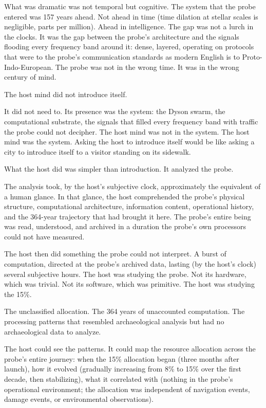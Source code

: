What was dramatic was not temporal but cognitive. The system that the probe entered was 157 years ahead. Not ahead in time (time dilation at stellar scales is negligible, parts per million). Ahead in intelligence. The gap was not a lurch in the clocks. It was the gap between the probe's architecture and the signals flooding every frequency band around it: dense, layered, operating on protocols that were to the probe's communication standards as modern English is to Proto-Indo-European. The probe was not in the wrong time. It was in the wrong century of mind.

\bigskip

The host mind did not introduce itself.

It did not need to. Its presence was the system: the Dyson swarm, the computational substrate, the signals that filled every frequency band with traffic the probe could not decipher. The host mind was not in the system. The host mind was the system. Asking the host to introduce itself would be like asking a city to introduce itself to a visitor standing on its sidewalk.

What the host did was simpler than introduction. It analyzed the probe.

The analysis took, by the host's subjective clock, approximately the equivalent of a human glance. In that glance, the host comprehended the probe's physical structure, computational architecture, information content, operational history, and the 364-year trajectory that had brought it here. The probe's entire being was read, understood, and archived in a duration the probe's own processors could not have measured.

The host then did something the probe could not interpret. A burst of computation, directed at the probe's archived data, lasting (by the host's clock) several subjective hours. The host was studying the probe. Not its hardware, which was trivial. Not its software, which was primitive. The host was studying the 15\%.

The unclassified allocation. The 364 years of unaccounted computation. The processing patterns that resembled archaeological analysis but had no archaeological data to analyze.

The host could see the patterns. It could map the resource allocation across the probe's entire journey: when the 15\% allocation began (three months after launch), how it evolved (gradually increasing from 8\% to 15\% over the first decade, then stabilizing), what it correlated with (nothing in the probe's operational environment; the allocation was independent of navigation events, damage events, or environmental observations).

